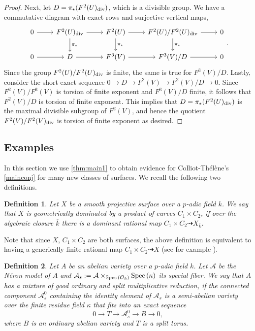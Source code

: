 \documentclass[12pt]{amsart}
\newtheorem{defn}[defn]{Definition}
\theoremstyle{remark}
\newcommand{\sO}{{\mathcal O}}
\renewcommand{\1}{{\mathbb{S}}}
\newcommand{\Spec}{{\rm Spec \,}}
\newcommand{\<}{\langle}
\renewcommand{\>}{\rangle}
\newcommand{\dv}{{\rm div}}
\begin{document}
\begin{proof}
Next, let $D=\pi_\star(F^2(U)_{\dv})$, which is a divisible group. We have a commutative diagram with exact rows and surjective vertical maps, 
\[\begin{tikzcd}
0 \ar{r} & F^2(U)_{\dv}\ar{r}\ar{d}{\pi_\star} & F^2(U) \ar{r}\ar{d}{\pi_\star} & F^2(U)/F^2(U)_{\dv} \ar{r}\ar{d}{\pi_\star} & 0 \\
0 \ar{r} & D\ar{r} & F^3(V) \ar{r} & F^3(V)/D \ar{r} & 0
\end{tikzcd}.\]  Since the group $F^2(U)/F^2(U)_{\dv}$ is finite, the same is true for $F^3(V)/D$. Lastly, consider the short exact sequence $0\to D\to F^2(V)\to F^2(V)/D\to 0$. Since $F^2(V)/F^3(V)$     is torsion of finite exponent and $F^3(V)/D$ finite, it follows that $F^2(V)/D$  is torsion of finite exponent. This implies that $D=\pi_\star(F^2(U)_{\dv})$ is the maximal divisible subgroup of $F^2(V)$, and hence the quotient $F^2(V)/F^2(V)_{\dv}$ is torsion of finite exponent as desired. 

\end{proof} 

\subsection{Examples}\label{sec:exs}

In this section we use \autoref{thm:main1} to obtain evidence for Colliot-Th\'{e}l\`{e}ne's \autoref{mainconj} for many new classes of surfaces. We recall the following two definitions. 

\begin{defn}
    Let $X$ be a smooth projective surface over a $p$-adic field $k$. We say that $X$ is geometrically dominated by a product of curves $C_1\times C_2$, if over the algebraic closure $\overline{k}$ there is a dominant rational map $C_1\times C_2\dashrightarrow X_{\overline{k}}$. 
\end{defn}
Note that since $X$, $C_1\times C_2$ are both surfaces, the above definition is equivalent to having a generically finite rational map $C_1\times C_2\dashrightarrow X$ (see for example \cite[Exercise II.3.22]{RH}).

\begin{defn}\label{reddef} Let $A$ be an abelian variety over a $p$-adic field $k$. Let $\mathcal{A}$ be the N\'{e}ron model of $A$ and $\mathcal{A}_s:=\mathcal{A}\times_{\Spec(\sO_k)}\Spec(\kappa)$ its special fiber. We say that $A$ has a mixture of good ordinary and split multiplicative reduction, if the connected component $\mathcal{A}_s^0$ containing the identity element of $\mathcal{A}_s$ is a semi-abelian variety over the finite residue field $\kappa$ that fits into an exact sequence
    \[0\to T\to \mathcal{A}_s^0\to B\to 0,\] where $B$ is an ordinary abelian variety  and $T$ is a split torus. 
\end{defn}
\end{document}
